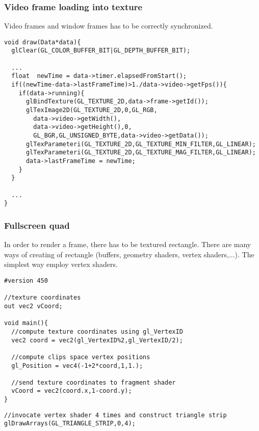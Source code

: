 \begin{frame}[fragile]
\frametitle{Video frame loading into texture}
  Video frames and window frames has to be correctly synchronized.
  {\scriptsize
  \begin{verbatim}
void draw(Data*data){
  glClear(GL_COLOR_BUFFER_BIT|GL_DEPTH_BUFFER_BIT);

  ...
  float  newTime = data->timer.elapsedFromStart();
  if((newTime-data->lastFrameTime)>1./data->video->getFps()){
    if(data->running){
      glBindTexture(GL_TEXTURE_2D,data->frame->getId());
      glTexImage2D(GL_TEXTURE_2D,0,GL_RGB,
        data->video->getWidth(),
        data->video->getHeight(),0,
        GL_BGR,GL_UNSIGNED_BYTE,data->video->getData());
      glTexParameteri(GL_TEXTURE_2D,GL_TEXTURE_MIN_FILTER,GL_LINEAR);
      glTexParameteri(GL_TEXTURE_2D,GL_TEXTURE_MAG_FILTER,GL_LINEAR);
      data->lastFrameTime = newTime;
    }
  }

  ...
}
  \end{verbatim}
  }
\end{frame}



\begin{frame}[fragile]
\frametitle{Fullscreen quad}
  In order to render a frame, there has to be textured rectangle.
  There are many ways of creating of rectangle (buffers, geometry shaders, vertex shaders,...).
  The simplest way employ vertex shaders.
  {\scriptsize
  \begin{verbatim}
#version 450

//texture coordinates
out vec2 vCoord;

void main(){
  //compute texture coordinates using gl_VertexID
  vec2 coord = vec2(gl_VertexID%2,gl_VertexID/2);

  //compute clips space vertex positions
  gl_Position = vec4(-1+2*coord,1,1.);

  //send texture coordinates to fragment shader
  vCoord = vec2(coord.x,1-coord.y);
}
  \end{verbatim}
  }
  {\scriptsize
  \begin{verbatim}
//invocate vertex shader 4 times and construct triangle strip
glDrawArrays(GL_TRIANGLE_STRIP,0,4);
  \end{verbatim}
  }
\end{frame}

